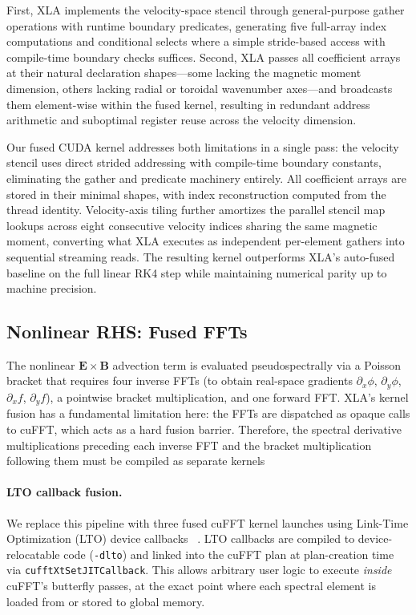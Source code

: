 \documentclass{article}
\theoremstyle{plain}
\theoremstyle{definition}
\theoremstyle{remark}
\begin{document}
First, XLA implements the velocity-space stencil through general-purpose gather operations with runtime boundary predicates, generating five full-array index computations and conditional selects where a simple stride-based access with compile-time boundary checks suffices. Second, XLA passes all coefficient arrays at their natural declaration shapes—some lacking the magnetic moment dimension, others lacking radial or toroidal wavenumber axes—and broadcasts them element-wise within the fused kernel, resulting in redundant address arithmetic and suboptimal register reuse across the velocity dimension. 

Our fused CUDA kernel addresses both limitations in a single pass: the velocity stencil uses direct strided addressing with compile-time boundary constants, eliminating the gather and predicate machinery entirely. All coefficient arrays are stored in their minimal shapes, with index reconstruction computed from the thread identity. Velocity-axis tiling further amortizes the parallel stencil map lookups across eight consecutive velocity indices sharing the same magnetic moment, converting what XLA executes as independent per-element gathers into sequential streaming reads. The resulting kernel outperforms XLA's auto-fused baseline on the full linear RK4 step while maintaining numerical parity up to machine precision.

\subsection{Nonlinear RHS: Fused FFTs }
\label{sec:nonlinear_fft}
 
The nonlinear $\mathbf{E}\times\mathbf{B}$ advection term is evaluated pseudospectrally via a Poisson bracket that requires four inverse FFTs (to obtain real-space gradients $\partial_x\phi$, $\partial_y\phi$, $\partial_x f$, $\partial_y f$), a pointwise bracket multiplication, and one forward FFT. XLA's kernel fusion has a fundamental limitation here: the FFTs are dispatched as opaque calls to cuFFT, which acts as a hard fusion barrier. Therefore, the spectral derivative multiplications preceding each inverse FFT and the bracket multiplication following them must be compiled as separate kernels
 
\paragraph{LTO callback fusion.}
We replace this pipeline with three fused cuFFT kernel launches using Link-Time Optimization (LTO) device callbacks ~\cite{cufft_lto}. LTO callbacks are compiled to device-relocatable code (\texttt{-dlto}) and linked into the cuFFT plan at plan-creation time via \texttt{cufftXtSetJITCallback}. This allows arbitrary user logic to execute \emph{inside} cuFFT's butterfly passes, at the exact point where each spectral element is loaded from or stored to global memory.
 
\end{document}
